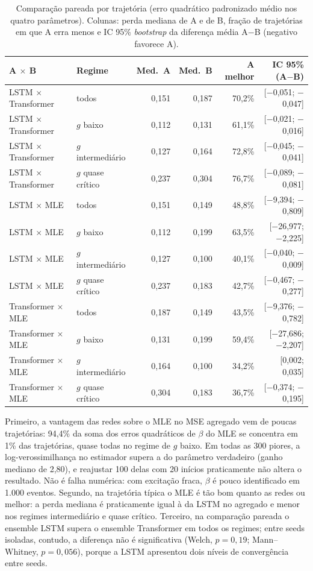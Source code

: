 \begin{table}[htbp]
\centering
\caption{Comparação pareada por trajetória (erro quadrático padronizado médio
nos quatro parâmetros). Colunas: perda mediana de A e de B, fração de
trajetórias em que A erra menos e IC 95\% \emph{bootstrap} da diferença média
A$-$B (negativo favorece A).}
\label{tab:posthoc-pareado}
\footnotesize
\begin{tabular}{llrrrr}
\toprule
A $\times$ B & Regime & Med.\ A & Med.\ B & A melhor & IC 95\% (A$-$B)\\
\midrule
LSTM $\times$ Transformer & todos & 0,151 & 0,187 & 70,2\% & [$-$0,051; $-$0,047]\\
LSTM $\times$ Transformer & $g$ baixo & 0,112 & 0,131 & 61,1\% & [$-$0,021; $-$0,016]\\
LSTM $\times$ Transformer & $g$ intermediário & 0,127 & 0,164 & 72,8\% & [$-$0,045; $-$0,041]\\
LSTM $\times$ Transformer & $g$ quase crítico & 0,237 & 0,304 & 76,7\% & [$-$0,089; $-$0,081]\\
\midrule
LSTM $\times$ MLE & todos & 0,151 & 0,149 & 48,8\% & [$-$9,394; $-$0,809]\\
LSTM $\times$ MLE & $g$ baixo & 0,112 & 0,199 & 63,5\% & [$-$26,977; $-$2,225]\\
LSTM $\times$ MLE & $g$ intermediário & 0,127 & 0,100 & 40,1\% & [$-$0,040; $-$0,009]\\
LSTM $\times$ MLE & $g$ quase crítico & 0,237 & 0,183 & 42,7\% & [$-$0,467; $-$0,277]\\
\midrule
Transformer $\times$ MLE & todos & 0,187 & 0,149 & 43,5\% & [$-$9,376; $-$0,782]\\
Transformer $\times$ MLE & $g$ baixo & 0,131 & 0,199 & 59,4\% & [$-$27,686; $-$2,207]\\
Transformer $\times$ MLE & $g$ intermediário & 0,164 & 0,100 & 34,2\% & [0,002; 0,035]\\
Transformer $\times$ MLE & $g$ quase crítico & 0,304 & 0,183 & 36,7\% & [$-$0,374; $-$0,195]\\
\bottomrule
\end{tabular}
\end{table}

Primeiro, a vantagem das redes sobre
o MLE no MSE agregado vem de poucas trajetórias: 94,4\% da soma
dos erros quadráticos de $\beta$ do MLE se concentra em 1\% das trajetórias,
quase todas no regime de $g$ baixo. Em todas as 300 piores, a log-verossimilhança
no estimador supera a do parâmetro verdadeiro (ganho mediano de 2,80), e reajustar
100 delas com 20 inícios praticamente não altera o resultado. Não é
falha numérica: com excitação fraca, $\beta$ é pouco identificado em 1.000
eventos. Segundo, na trajetória típica o MLE é tão bom quanto as redes ou
melhor: a perda mediana é praticamente igual à da LSTM no agregado e menor nos
regimes intermediário e quase crítico. Terceiro, na comparação pareada o
ensemble LSTM supera o ensemble Transformer em todos os regimes; entre seeds
isoladas, contudo, a diferença não é significativa (Welch, $p=0,19$;
Mann--Whitney, $p=0,056$), porque a LSTM
apresentou dois níveis de convergência entre seeds.

